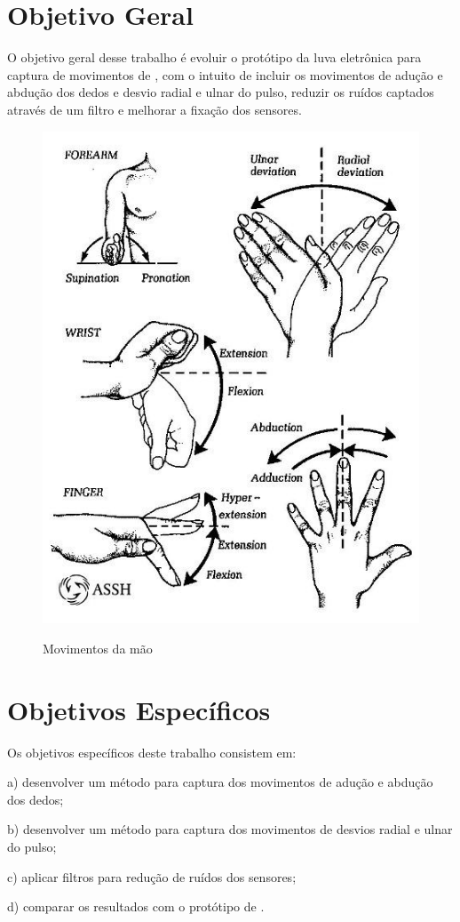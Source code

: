 \section{Objetivo Geral}
\label{sec:objg}
O objetivo geral desse trabalho é evoluir o protótipo da luva eletrônica para captura de movimentos de , com o intuito de incluir os movimentos de adução e abdução dos dedos e desvio radial e ulnar do pulso, reduzir os ruídos captados através de um filtro e melhorar a fixação dos sensores.

\begin{figure}[ht]
\setlength{\abovecaptionskip}{0pt}
\setlength{\belowcaptionskip}{0pt}
\caption[Movimentos da mão]{Movimentos da mão}
\centering
\includegraphics[width=.5\textwidth]{imagem/movimentos}
\captionsetup{justification=centering}
\label{fig:movimentos}
\end{figure}

\section{Objetivos Específicos}
\label{sec:obje}
Os objetivos específicos deste trabalho consistem em:
  
\begin{compactitem}
	\item[a)] desenvolver um método para captura dos movimentos de adução e abdução dos dedos;
	\item[b)] desenvolver um método para captura dos movimentos de desvios radial e ulnar do pulso;
	\item[c)] aplicar filtros para redução de ruídos dos sensores;
    \item[d)] comparar os resultados com o protótipo de .
\end{compactitem}


